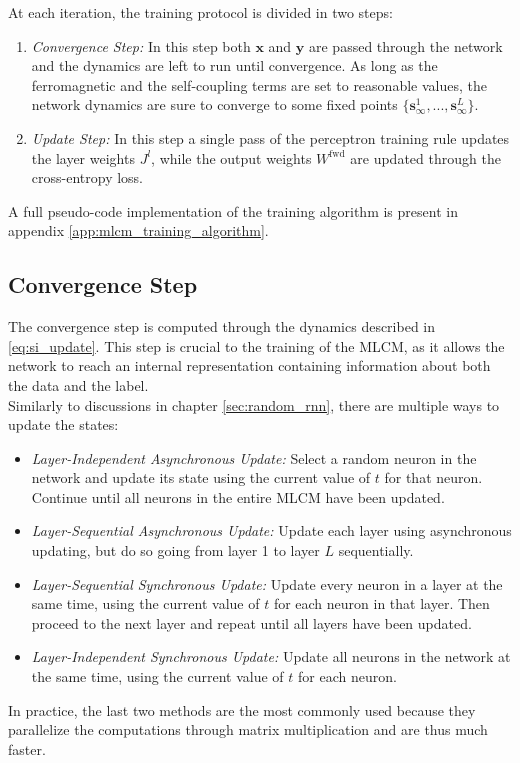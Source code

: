 \documentclass[a4paper,12pt]{report}
\begin{document}
At each iteration, the training protocol is divided in two steps: 
\begin{enumerate}
    \itemsep-5pt
    \vspace*{-5pt}
    \item \emph{Convergence Step:} In this step both $\mathbf{x}$ and $\mathbf{y}$ are
    passed through the network and the dynamics are left to run until convergence. As 
    long as the ferromagnetic and the self-coupling terms are set to reasonable values,
    the network dynamics are sure to converge to some fixed points 
    $\{\mathbf{s}^{1}_{\infty}, ..., \mathbf{s}^{L}_{\infty}\}$.
    
    \item \emph{Update Step:} In this step a single pass of the perceptron training
    rule updates the layer weights $J^l$, while the output weights $W^{\mathrm{fwd}}$
    are updated through the cross-entropy loss. 
\end{enumerate}

A full pseudo-code implementation of the training algorithm is present in appendix
\ref{app:mlcm_training_algorithm}.
%
\subsection{Convergence Step}
The convergence step is computed through the dynamics described in \ref{eq:si_update}. 
This step is crucial to the training of the MLCM, as it allows the network to reach an 
internal representation containing information about both the data and the label. \\
Similarly to discussions in chapter \ref{sec:random_rnn}, there are multiple ways to
update the states:
\begin{itemize}
    \itemsep-5pt
    \vspace*{-5pt}
    \item \emph{Layer-Independent Asynchronous Update:} Select a random neuron in 
    the network and update its state using the current value of $t$ for that neuron.
    Continue until all neurons in the entire MLCM have been updated. 
    \item \emph{Layer-Sequential Asynchronous Update:} Update each layer using 
    asynchronous updating, but do so going from layer 1 to layer $L$ sequentially.
    \item \emph{Layer-Sequential Synchronous Update:} Update every neuron in a layer
    at the same time, using the current value of $t$ for each neuron in that layer.
    Then proceed to the next layer and repeat until all layers have been updated.
    \item \emph{Layer-Independent Synchronous Update:} Update all neurons in the
    network at the same time, using the current value of $t$ for each neuron.
\end{itemize}
In practice, the last two methods are the most commonly used because they parallelize 
the computations through matrix multiplication and are thus much faster.
\vspace{0.5em}
\end{document}
